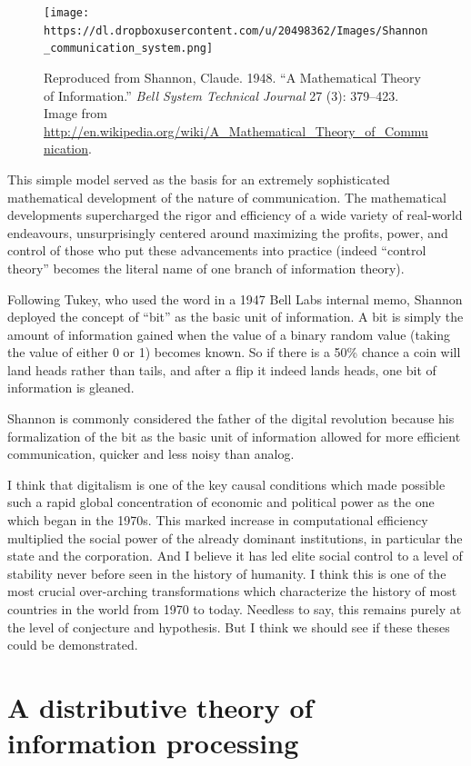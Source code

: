 \documentclass[12pt,book]{article}
\begin{document}
\begin{figure}[htbp]
\centering
\texttt{[image: https://dl.dropboxusercontent.com/u/20498362/Images/Shannon\_communication\_system.png]}
\caption{Reproduced from Shannon, Claude. 1948. ``A Mathematical Theory
of Information.'' \emph{Bell System Technical Journal} 27 (3): 379--423.
Image from
\url{http://en.wikipedia.org/wiki/A_Mathematical_Theory_of_Communication}.}
\end{figure}

This simple model served as the basis for an extremely sophisticated
mathematical development of the nature of communication. The
mathematical developments supercharged the rigor and efficiency of a
wide variety of real-world endeavours, unsurprisingly centered around
maximizing the profits, power, and control of those who put these
advancements into practice (indeed ``control theory'' becomes the
literal name of one branch of information theory).

Following Tukey, who used the word in a 1947 Bell Labs internal memo,
Shannon deployed the concept of ``bit'' as the basic unit of
information. A bit is simply the amount of information gained when the
value of a binary random value (taking the value of either 0 or 1)
becomes known. So if there is a 50\% chance a coin will land heads
rather than tails, and after a flip it indeed lands heads, one bit of
information is gleaned.

Shannon is commonly considered the father of the digital revolution
because his formalization of the bit as the basic unit of information
allowed for more efficient communication, quicker and less noisy than
analog.

I think that digitalism is one of the key causal conditions which made
possible such a rapid global concentration of economic and political
power as the one which began in the 1970s. This marked increase in
computational efficiency multiplied the social power of the already
dominant institutions, in particular the state and the corporation. And
I believe it has led elite social control to a level of stability never
before seen in the history of humanity. I think this is one of the most
crucial over-arching transformations which characterize the history of
most countries in the world from 1970 to today. Needless to say, this
remains purely at the level of conjecture and hypothesis. But I think we
should see if these theses could be demonstrated.

\section{A distributive theory of information
processing}\label{a-distributive-theory-of-information-processing}
\end{document}
